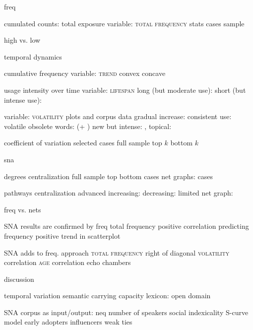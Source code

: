 
freq

  cumulated counts: total exposure
    variable: \textsc{total frequency}
    stats
      cases
      sample

    high vs. low

  temporal dynamics

    cumulative frequency
      variable: \textsc{trend}
        convex
        concave

    usage intensity over time
      variable: \textsc{lifespan}
        long (but moderate use): 
        short (but intense use): 

      variable: \textsc{volatility}
        plots and corpus data
          gradual increase: 
          consistent use: 
          volatile
            obsolete words:  (+ )
            new but intense: , 
            topical: 

        coefficient of variation
          selected cases
          full sample
            top $k$
            bottom $k$

sna

  degrees
    centralization
      full sample
        top
        bottom
      cases
    net graphs: cases

  pathways
    centralization
      advanced
      increasing:
      decreasing:
      limited
    net graph: 

freq vs. nets


  SNA results are confirmed by freq
    total frequency
      positive correlation
      predicting frequency
      positive trend in scatterplot

  SNA adds to freq. approach
    \textsc{total frequency}
      right of diagonal
    \textsc{volatility}
      correlation
    \textsc{age}
      correlation
    echo chambers

discussion

  temporal variation
    semantic carrying capacity
    lexicon: open domain

  SNA
    corpus as input/output: neq number of speakers
    social indexicality
    S-curve model
      early adopters
      influencers
      weak ties
